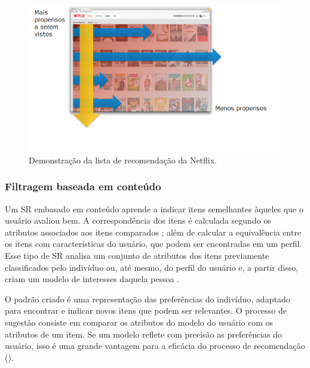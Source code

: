 \documentclass[portuguese]{textolivre}
\begin{document}
\begin{figure}[H]
	\centering
	\includegraphics[scale=1.10]{imagens/fig-025.png}
	\caption{Demonstração da lista de recomendação da Netflix. }

	\label{fig:001}
\end{figure}

\subsubsection{Filtragem baseada em conteúdo}

Um SR embasado em conteúdo aprende a indicar itens semelhantes àqueles que o usuário avaliou bem. A correspondência dos itens é calculada segundo os atributos associados aos itens comparados \cite{Ricci2011}; além de calcular a equivalência entre os itens com características do usuário, que podem ser encontradas em um perfil. Esse tipo de SR analisa um conjunto de atributos dos itens previamente classificados pelo indivíduo ou, até mesmo, do perfil do usuário e, a partir disso, criam um modelo de interesses daquela pessoa \cite{Zhang2019}.


O padrão criado é uma representação das preferências do indivíduo, adaptado para encontrar e indicar novos itens que podem ser relevantes. O processo de sugestão consiste em comparar os atributos do modelo do usuário com os atributos de um item. Se um modelo reflete com precisão as preferências do usuário, isso é uma grande vantagem para a eficácia do processo de recomendação \cite{Lops:2011} ().
\end{document}
